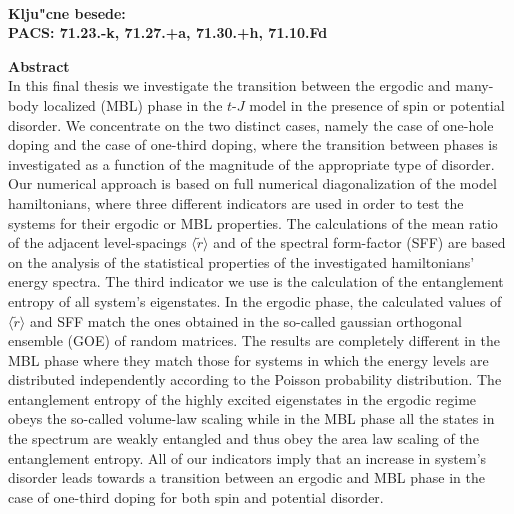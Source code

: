\vspace{1cm}\\
{\bf Klju"cne besede:}\\
{\bf PACS: 71.23.-k, 71.27.+a, 71.30.+h, 71.10.Fd}


\cleardoublepage
{\Large \bf Abstract}
\vspace{1cm}\\
In this final thesis we investigate the transition between the ergodic and many-body localized (MBL) phase in the $t$-$J$ model in the presence of spin or potential disorder. We concentrate on the two distinct cases, namely the case of one-hole doping and the case of one-third doping, where the transition between phases is investigated as a function of the magnitude of the appropriate type of disorder. Our numerical approach is based on full numerical diagonalization of the model hamiltonians, where three different indicators are used in order to test the systems for their ergodic or MBL properties. The calculations of the mean ratio of the adjacent level-spacings $\langle \tilde{r}\rangle$ and of the spectral form-factor (SFF) are based on the analysis of the statistical properties of the investigated hamiltonians' energy spectra. The third indicator we use is the calculation of the entanglement entropy of all system's eigenstates. In the ergodic phase, the calculated values of $\langle\tilde{r}\rangle$ and SFF match the ones obtained in the so-called gaussian orthogonal ensemble (GOE) of random matrices. The results are completely different in the MBL phase where they match those for systems in which the energy levels are distributed independently according to the Poisson probability distribution. The entanglement entropy of the highly excited eigenstates in the ergodic regime obeys the so-called volume-law scaling while in the MBL phase all the states in the spectrum are weakly entangled and thus obey the area law scaling of the entanglement entropy. All of our indicators imply that an increase in system's disorder leads towards a transition between an ergodic and MBL phase in the case of one-third doping for both spin and potential disorder.
